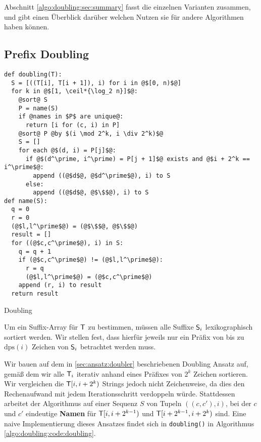 Abschnitt \ref{algo:doubling:sec:summary} fasst die einzelnen Varianten zusammen, und gibt einen Überblick darüber welchen Nutzen sie für andere Algorithmen haben können.

\subsection{Prefix Doubling}
\label{algo:doubling:sec:doubling}
\begin{listing}[htp]
\begin{verbatim}
def doubling(T):
  S = [((T[i], T[i + 1]), i) for i in @$[0, n)$@]
  for k in @$[1, \ceil*{\log_2 n}]$@:
    @sort@ S
    P = name(S)
    if @names in $P$ are unique@:
      return [i for (c, i) in P]
    @sort@ P @by $(i \mod 2^k, i \div 2^k)$@
    S = []
    for each @$(d, i) = P[j]$@:
      if @$(d^\prime, i^\prime) = P[j + 1]$@ exists and @$i + 2^k == i^\prime$@:
        append ((@$d$@, @$d^\prime$@), i) to S
      else:
        append ((@$d$@, @$\$$@), i) to S
def name(S):
  q = 0
  r = 0
  (@$l,l^\prime$@) = (@$\$$@, @$\$$@)
  result = []
  for ((@$c,c^\prime$@), i) in S:
    q = q + 1
    if (@$c,c^\prime$@) != (@$l,l^\prime$@):
      r = q
      (@$l,l^\prime$@) = (@$c,c^\prime$@)
    append (r, i) to result
  return result
\end{verbatim}
\caption{Doubling} 
\label{algo:doubling:code:doubling}
\end{listing}

 Um ein Suffix-Array für $\inputtext$ zu bestimmen, müssen alle Suffixe $\mathsf{S}_{i}$ lexikographisch sortiert werden. Wir stellen fest, dass hierfür jeweils nur ein Präfix von bis zu $\text{dps}(i)$ Zeichen von $\mathsf{S}_{i}$ betrachtet werden muss. 

Wir bauen auf dem in \cref{sec:ansatz:doubler} beschriebenen Doubling Ansatz auf, gemäß dem wir alle $\inputtext_i$ iterativ anhand eines Präfixes von $2^k$ Zeichen sortieren. Wir vergleichen die $\inputtext{}[i, i + 2^k)$ Strings jedoch nicht Zeichenweise, da dies den Rechenaufwand mit jedem Iterationsschritt verdoppeln würde. Stattdessen arbeitet der Algorithmus auf einer Sequenz $S$ von Tupeln $((c, c'), i)$, bei der $c$ und $c'$ eindeutige \textbf{Namen} für $\inputtext{}[i, i + 2^{k-1})$ und $\inputtext{}[i + 2^{k-1}, i + 2^k)$ sind. Eine naive Implementierung dieses Ansatzes findet sich in \texttt{doubling()} in Algorithmus \ref{algo:doubling:code:doubling}.

